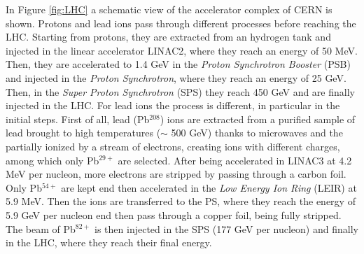 In Figure \ref{fig:LHC} a schematic view of the accelerator complex of CERN is shown. Protons and lead ions pass through different processes before reaching the LHC. Starting from protons, they are extracted from an hydrogen tank and injected in the linear accelerator LINAC2, where they reach an energy of 50 MeV. Then, they are accelerated to 1.4 GeV in the \textit{Proton Synchrotron Booster} (PSB) and injected in the \textit{Proton Synchrotron}, where they reach an energy of 25 GeV. Then, in the \textit{Super Proton Synchrotron} (SPS) they reach 450 GeV and are finally injected in the LHC. For lead ions the process is different, in particular in the initial steps. First of all, lead (Pb$^{208}$) ions are extracted from a purified sample of lead brought to high temperatures ($\sim$ 500 GeV) thanks to microwaves and the partially ionized by a stream of electrons, creating ions with different charges, among which only Pb$^{29+}$ are selected. After being accelerated in LINAC3 at 4.2 MeV per nucleon, more electrons are stripped by passing through a carbon foil. Only Pb$^{54+}$ are kept end then accelerated in the \textit{Low Energy Ion Ring} (LEIR) at 5.9 MeV. Then the ions are transferred to the PS, where they reach the energy of 5.9 GeV per nucleon end then pass through a copper foil, being fully stripped. The beam of Pb$^{82+}$ is then injected in the SPS (177 GeV per nucleon) and finally in the LHC, where they reach their final energy.
